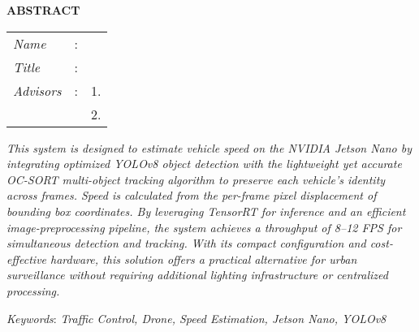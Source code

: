 \begin{center}
  \large\textbf{ABSTRACT}
\end{center}


\vspace{2ex}

\begingroup
\setlength{\tabcolsep}{0pt}

\noindent
\begin{tabularx}{\textwidth}{l >{\centering}m{3em} X}
  \emph{Name}     & : & \name{}         \\

  \emph{Title}    & : & \engtatitle{}   \\

  \emph{Advisors} & : & 1. \advisor{}   \\
                  &   & 2. \coadvisor{} \\
\end{tabularx}
\endgroup

\emph{
  This system is designed to estimate vehicle speed on the NVIDIA Jetson Nano by integrating optimized YOLOv8 object detection with the lightweight yet accurate OC-SORT multi-object tracking algorithm to preserve each vehicle’s identity across frames. Speed is calculated from the per-frame pixel displacement of bounding box coordinates. By leveraging TensorRT for inference and an efficient image-preprocessing pipeline, the system achieves a throughput of 8–12 FPS for simultaneous detection and tracking. With its compact configuration and cost-effective hardware, this solution offers a practical alternative for urban surveillance without requiring additional lighting infrastructure or centralized processing.
}

\emph{Keywords}: \emph{Traffic Control, Drone, Speed Estimation, Jetson Nano, YOLOv8}
